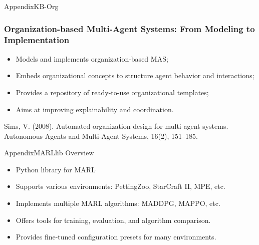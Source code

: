 \begin{frame}{Appendix}{KB-Org}
    \frametitle{Organization-based Multi-Agent Systems: From Modeling to Implementation}

    \begin{itemize}
        \item Models and implements organization-based MAS;
        \item Embeds organizational concepts to structure agent behavior and interactions;
        \item Provides a repository of ready-to-use organizational templates;
        \item Aims at improving explainability and coordination.
    \end{itemize}

    \vspace{1em}
    Sims, V. (2008). Automated organization design for multi-agent systems. Autonomous Agents and Multi-Agent Systems, 16(2), 151–185.

\end{frame}

\begin{frame}{Appendix}{MARLlib Overview}

    \begin{itemize}
        \item Python library for MARL
        \item Supports various environments: PettingZoo, StarCraft II, MPE, etc.
        \item Implements multiple MARL algorithms: MADDPG, MAPPO, etc.
        \item Offers tools for training, evaluation, and algorithm comparison.
        \item Provides fine-tuned configuration presets for many environments.
    \end{itemize}

\end{frame}

